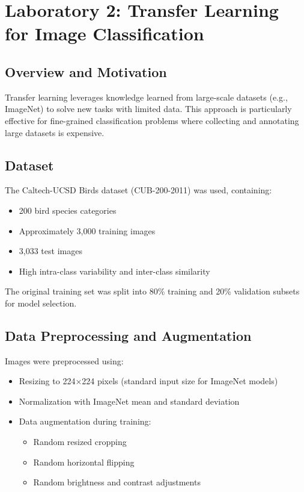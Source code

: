 \documentclass[conference]{IEEEtran}
\begin{document}
\section{Laboratory 2: Transfer Learning for Image Classification}

\subsection{Overview and Motivation}

Transfer learning leverages knowledge learned from large-scale datasets (e.g., ImageNet) to solve new tasks with limited data. This approach is particularly effective for fine-grained classification problems where collecting and annotating large datasets is expensive.

\subsection{Dataset}

The Caltech-UCSD Birds dataset (CUB-200-2011) was used, containing:
\begin{itemize}
\item 200 bird species categories
\item Approximately 3,000 training images
\item 3,033 test images
\item High intra-class variability and inter-class similarity
\end{itemize}

The original training set was split into 80\% training and 20\% validation subsets for model selection.

\subsection{Data Preprocessing and Augmentation}

Images were preprocessed using:
\begin{itemize}
\item Resizing to 224×224 pixels (standard input size for ImageNet models)
\item Normalization with ImageNet mean and standard deviation
\item Data augmentation during training:
\begin{itemize}
\item Random resized cropping
\item Random horizontal flipping
\item Random brightness and contrast adjustments
\end{itemize}
\end{itemize}
\end{document}
